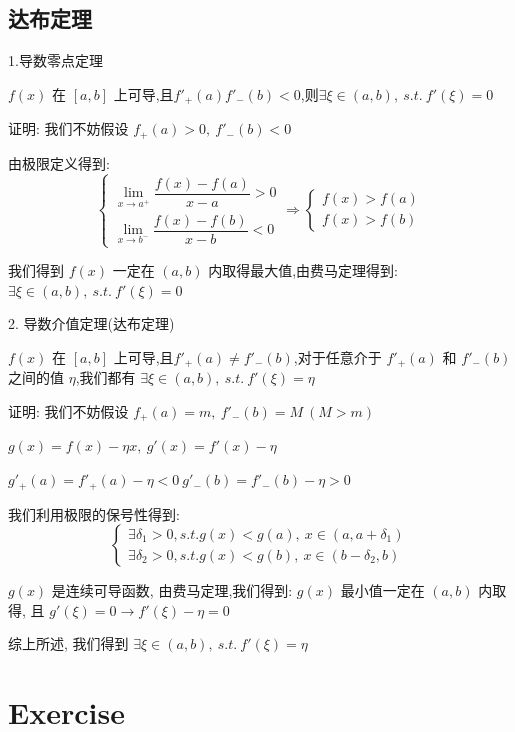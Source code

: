\subsection{达布定理}
\begin{theorem}
	1.导数零点定理

	$f(x)$ 在 $[a,b]$ 上可导,且$f'_{+}(a)f'_{-}(b)<0$,则$\exists \xi\in(a,b),\ s.t.\ f'(\xi)=0$

	证明: 我们不妨假设 $f_{+}(a)>0,\ f'_{-}(b)<0$

	由极限定义得到:
	$$\left\lbrace
		\begin{array}{l}
			\lim\limits_{x\rightarrow a^{+}}\dfrac{f(x)-f(a)}{x-a}>0 \\
			\lim\limits_{x\rightarrow b^{-}}\dfrac{f(x)-f(b)}{x-b}<0
		\end{array}
		\right. \Rightarrow
		\left\lbrace
		\begin{array}{l}
			f(x)>f(a) \\
			f(x)>f(b)
		\end{array}
		\right. $$

	我们得到 $f(x)$ 一定在 $(a,b)$ 内取得最大值,由费马定理得到: $\exists \xi\in(a,b),\ s.t.\ f'(\xi)=0$

	2. 导数介值定理(达布定理)

	$f(x)$ 在 $[a,b]$ 上可导,且$f'_{+}(a)\neq f'_{-}(b)$,对于任意介于 $f'_{+}(a)$ 和 $f'_{-}(b)$ 之间的值 $\eta$,我们都有 $\exists \xi\in(a,b),\ s.t.\ f'(\xi)=\eta$

	证明: 我们不妨假设 $f_{+}(a)=m,\ f'_{-}(b)=M\ (M>m)$

	$g(x)=f(x)-\eta x,\ g'(x)=f'(x)-\eta$

	$g'_{+}(a)=f'_{+}(a)-\eta<0\ g'_{-}(b)=f'_{-}(b)-\eta>0$

	我们利用极限的保号性得到:
	$$\begin{cases}
		\exists \delta_{1}>0, s.t. g(x)<g(a),\ x\in(a,a+\delta_{1}) \\
		\exists \delta_{2}>0, s.t. g(x)<g(b),\ x\in(b-\delta_{2},b)
	\end{cases}$$

	$g(x)$ 是连续可导函数, 由费马定理,我们得到: $g(x)$ 最小值一定在 $(a,b)$ 内取得, 且 $g'(\xi)=0\to f'(\xi) -\eta =0$

	综上所述, 我们得到 $\exists \xi\in(a,b),\ s.t.\ f'(\xi)=\eta$
\end{theorem}
\section{Exercise}

